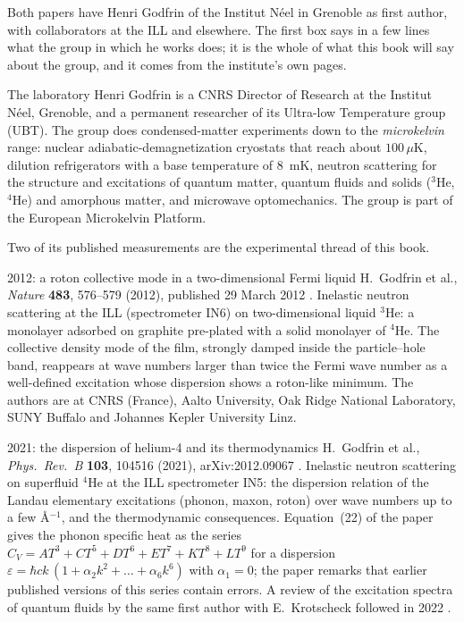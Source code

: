 Both papers have Henri Godfrin of the Institut N\'eel in Grenoble as first author, with collaborators at the ILL and elsewhere. The first box says in a few lines what the group in which he works does; it is the whole of what this book will say about the group, and it comes from the institute's own pages.

\begin{godfrinbox}{The laboratory}
Henri Godfrin is a CNRS Director of Research at the Institut N\'eel, Grenoble, and a permanent researcher of its Ultra-low Temperature group (UBT). The group does condensed-matter experiments down to the \emph{microkelvin} range: nuclear adiabatic-demagnetization cryostats that reach about $100\,\mu$K, dilution refrigerators with a base temperature of 8~mK, neutron scattering for the structure and excitations of quantum matter, quantum fluids and solids ($^3$He, $^4$He) and amorphous matter, and microwave optomechanics. The group is part of the European Microkelvin Platform.
\end{godfrinbox}

Two of its published measurements are the experimental thread of this book.

\begin{godfrinbox}{2012: a roton collective mode in a two-dimensional Fermi liquid}
H.~Godfrin et al., \emph{Nature} \textbf{483}, 576--579 (2012), published 29 March 2012 \cite{Godfrin2012}. Inelastic neutron scattering at the ILL (spectrometer IN6) on two-dimensional liquid $^3$He: a monolayer adsorbed on graphite pre-plated with a solid monolayer of $^4$He. The collective density mode of the film, strongly damped inside the particle--hole band, reappears at wave numbers larger than twice the Fermi wave number as a well-defined excitation whose dispersion shows a roton-like minimum. The authors are at CNRS (France), Aalto University, Oak Ridge National Laboratory, SUNY Buffalo and Johannes Kepler University Linz.
\end{godfrinbox}

\begin{godfrinbox}{2021: the dispersion of helium-4 and its thermodynamics}
H.~Godfrin et al., \emph{Phys.\ Rev.\ B} \textbf{103}, 104516 (2021), arXiv:2012.09067 \cite{Godfrin2021}. Inelastic neutron scattering on superfluid $^4$He at the ILL spectrometer IN5: the dispersion relation of the Landau elementary excitations (phonon, maxon, roton) over wave numbers up to a few \AA$^{-1}$, and the thermodynamic consequences. Equation~(22) of the paper gives the phonon specific heat as the series $C_V=AT^3+CT^5+DT^6+ET^7+KT^8+LT^9$ for a dispersion $\varepsilon=\hbar ck\,(1+\alpha_2k^2+\dots+\alpha_6k^6)$ with $\alpha_1=0$; the paper remarks that earlier published versions of this series contain errors. A review of the excitation spectra of quantum fluids by the same first author with E.~Krotscheck followed in 2022 \cite{GodfrinKrotscheck2022}.
\end{godfrinbox}

